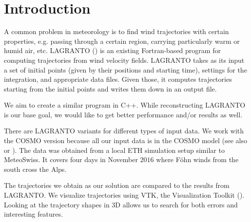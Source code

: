 \setcounter{chapter}{0}

\chapter{Introduction}

A common problem in meteorology is to find wind trajectories with certain properties, e.g. passing through a certain region, carrying particularly warm or humid air, etc.
LAGRANTO (\cite{src:lagranto}) is an existing Fortran-based program for computing trajectories from wind velocity fields.
LAGRANTO takes as its input a set of initial points (given by their positions and starting time), settings for the integration, and appropriate data files. Given those, it computes trajectories starting from the initial points and writes them down in an output file.

We aim to create a similar program in C++. While reconstructing LAGRANTO is our base goal, we would like to get better performance and/or results as well.

There are LAGRANTO variants for different types of input data. We work with the COSMO version because all our input data is in the COSMO model (see also \cite{src:cosmo} or \cite{src:cosmo2}). The data was obtained from a local ETH simulation setup similar to MeteoSwiss. It covers four days in November $2016$ where F\"ohn winds from the south cross the Alps.

The trajectories we obtain as our solution are compared to the results from LAGRANTO. We visualize trajectories using VTK, the Visualization Toolkit (\cite{src:vtk}). Looking at the trajectory shapes in 3D allows us to search for both errors and interesting features. %


